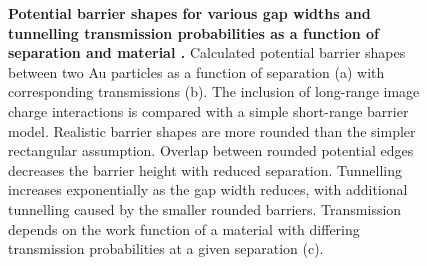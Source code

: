 \documentclass{article}
\begin{document}
\begin{figure}[bt]
\centering
{}
\caption[Potential barrier shapes for various gap widths and tunnelling transmission probabilities as a function of separation and material \cite{esteban2015}]{\textbf{Potential barrier shapes for various gap widths and tunnelling transmission probabilities as a function of separation and material \cite{esteban2015}.} Calculated potential barrier shapes between two Au particles as a function of separation (a) with corresponding transmissions (b). The inclusion of long-range image charge interactions is compared with a simple short-range barrier model. Realistic barrier shapes are more rounded than the simpler rectangular assumption. Overlap between rounded potential edges decreases the barrier height with reduced separation. Tunnelling increases exponentially as the gap width reduces, with additional tunnelling caused by the smaller rounded barriers. Transmission depends on the work function of a material with differing transmission probabilities at a given separation (c).}
\label{fig:esteban_tunnelling}
\end{figure}
\end{document}
